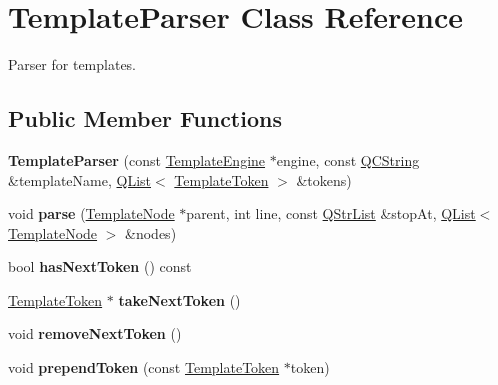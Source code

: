 \hypertarget{class_template_parser}{}\section{Template\+Parser Class Reference}
\label{class_template_parser}


Parser for templates.  


\subsection*{Public Member Functions}
\begin{DoxyCompactItemize}
\item 
\mbox{\label{class_template_parser_a074067c80442cfb4e103bc5183679073}} 
{\bfseries Template\+Parser} (const \mbox{\hyperlink{class_template_engine}{Template\+Engine}} $\ast$engine, const \mbox{\hyperlink{class_q_c_string}{Q\+C\+String}} \&template\+Name, \mbox{\hyperlink{class_q_list}{Q\+List}}$<$ \mbox{\hyperlink{class_template_token}{Template\+Token}} $>$ \&tokens)
\item 
\mbox{\label{class_template_parser_a09037d32371845f07d8996b0d7b1d24d}} 
void {\bfseries parse} (\mbox{\hyperlink{class_template_node}{Template\+Node}} $\ast$parent, int line, const \mbox{\hyperlink{class_q_str_list}{Q\+Str\+List}} \&stop\+At, \mbox{\hyperlink{class_q_list}{Q\+List}}$<$ \mbox{\hyperlink{class_template_node}{Template\+Node}} $>$ \&nodes)
\item 
\mbox{\label{class_template_parser_ac1c96e51a84e8b227749bfababed06d8}} 
bool {\bfseries has\+Next\+Token} () const
\item 
\mbox{\label{class_template_parser_acbe18fdf2b8306342e283e906826a3ae}} 
\mbox{\hyperlink{class_template_token}{Template\+Token}} $\ast$ {\bfseries take\+Next\+Token} ()
\item 
\mbox{\label{class_template_parser_ac3e5fb3ee5dfcccbcf85440bd3b59d53}} 
void {\bfseries remove\+Next\+Token} ()
\item 
\mbox{\label{class_template_parser_a2f48f4d2f14f5cafc4f662613c2046c5}} 
void {\bfseries prepend\+Token} (const \mbox{\hyperlink{class_template_token}{Template\+Token}} $\ast$token)

\end{DoxyCompactItemize}
